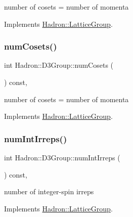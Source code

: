 number of cosets = number of momenta 

Implements \mbox{\hyperlink{structHadron_1_1LatticeGroup_afc76430f36a3a041f86d4058c59bf55e}{Hadron\+::\+Lattice\+Group}}.

\mbox{\label{structHadron_1_1D3Group_a33af6b6378351a7b023c23940c69403f}} 
\subsubsection{\texorpdfstring{numCosets()}{numCosets()}\hspace{0.1cm}{\footnotesize\ttfamily [3/3]}}
{\footnotesize\ttfamily int Hadron\+::\+D3\+Group\+::num\+Cosets (\begin{DoxyParamCaption}{ }\end{DoxyParamCaption}) const\hspace{0.3cm}{\ttfamily [inline]}, {\ttfamily [virtual]}}

number of cosets = number of momenta 

Implements \mbox{\hyperlink{structHadron_1_1LatticeGroup_afc76430f36a3a041f86d4058c59bf55e}{Hadron\+::\+Lattice\+Group}}.

\mbox{\label{structHadron_1_1D3Group_a442d9bebc6eae854024be8123fda60d8}} 
\subsubsection{\texorpdfstring{numIntIrreps()}{numIntIrreps()}\hspace{0.1cm}{\footnotesize\ttfamily [1/3]}}
{\footnotesize\ttfamily int Hadron\+::\+D3\+Group\+::num\+Int\+Irreps (\begin{DoxyParamCaption}{ }\end{DoxyParamCaption}) const\hspace{0.3cm}{\ttfamily [inline]}, {\ttfamily [virtual]}}

number of integer-\/spin irreps 

Implements \mbox{\hyperlink{structHadron_1_1LatticeGroup_af2aa7b39222bf188389356eefcef7547}{Hadron\+::\+Lattice\+Group}}.

\mbox{\label{structHadron_1_1D3Group_a442d9bebc6eae854024be8123fda60d8}} 
